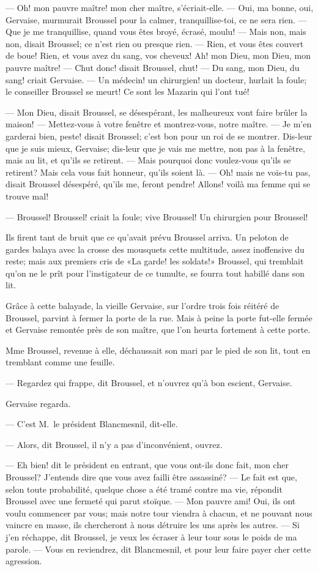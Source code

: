 — Oh! mon pauvre maître! mon cher maître, s'écriait-elle. — Oui, ma bonne, oui, Gervaise, murmurait Broussel pour la calmer, tranquillise-toi, ce ne sera rien. — Que je me tranquillise, quand vous êtes broyé, écrasé, moulu! — Mais non, mais non, disait Broussel; ce n'est rien ou presque rien. — Rien, et vous êtes couvert de boue! Rien, et vous avez du sang, vos cheveux! Ah! mon Dieu, mon Dieu, mon pauvre maître! — Chut donc! disait Broussel, chut! — Du sang, mon Dieu, du sang! criait Gervaise. — Un médecin! un chirurgien! un docteur, hurlait la foule; le conseiller Broussel se meurt! Ce sont les Mazarin qui l'ont tué!

— Mon Dieu, disait Broussel, se désespérant, les malheureux vont faire brûler la maison! — Mettez-vous à votre fenêtre et montrez-vous, notre maître. — Je m'en garderai bien, peste! disait Broussel; c'est bon pour un roi de se montrer. Dis-leur que je suis mieux, Gervaise; dis-leur que je vais me mettre, non pas à la fenêtre, mais au lit, et qu'ils se retirent. — Mais pourquoi donc voulez-vous qu'ils se retirent? Mais cela vous fait honneur, qu'ils soient là. — Oh! mais ne vois-tu pas, disait Broussel désespéré, qu'ils me, feront pendre! Allons! voilà ma femme qui se trouve mal!

— Broussel! Broussel! criait la foule; vive Broussel! Un chirurgien pour Broussel!

Ils firent tant de bruit que ce qu'avait prévu Broussel arriva. Un peloton de gardes balaya avec la crosse des mousquets cette multitude, assez inoffensive du reste; mais aux premiers cris de «La garde! les soldats!» Broussel, qui tremblait qu'on ne le prît pour l'instigateur de ce tumulte, se fourra tout habillé dans son lit.

Grâce à cette balayade, la vieille Gervaise, sur l'ordre trois fois réitéré de Broussel, parvint à fermer la porte de la rue. Mais à peine la porte fut-elle fermée et Gervaise remontée près de son maître, que l'on heurta fortement à cette porte.

Mme Broussel, revenue à elle, déchaussait son mari par le pied de son lit, tout en tremblant comme une feuille.

— Regardez qui frappe, dit Broussel, et n'ouvrez qu'à bon escient, Gervaise.

Gervaise regarda.

— C'est M.~le président Blancmesnil, dit-elle.

— Alors, dit Broussel, il n'y a pas d'inconvénient, ouvrez.

— Eh bien! dit le président en entrant, que vous ont-ils donc fait, mon cher Broussel? J'entends dire que vous avez failli être assassiné? — Le fait est que, selon toute probabilité, quelque chose a été tramé contre ma vie, répondit Broussel avec une fermeté qui parut stoïque. — Mon pauvre ami! Oui, ils ont voulu commencer par vous; mais notre tour viendra à chacun, et ne pouvant nous vaincre en masse, ils chercheront à nous détruire les uns après les autres. — Si j'en réchappe, dit Broussel, je veux les écraser à leur tour sous le poids de ma parole. — Vous en reviendrez, dit Blancmesnil, et pour leur faire payer cher cette agression.

